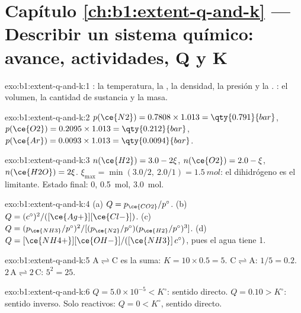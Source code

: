 \section*{Capítulo \ref{ch:b1:extent-q-and-k} --- Describir un sistema químico: avance, actividades, Q y K}

\begin{solution}{exo:b1:extent-q-and-k:1}
: la temperatura, la , la densidad, la
presión y la . : el volumen, la cantidad de
sustancia y la masa.
\end{solution}

\begin{solution}{exo:b1:extent-q-and-k:2}
$p(\ce{N2}) = 0.7808 \times 1.013 = \qty{0.791}{bar}$, $p(\ce{O2}) =
0.2095 \times 1.013 = \qty{0.212}{bar}$, $p(\ce{Ar}) = 0.0093 \times 1.013
= \qty{0.0094}{bar}$.
\end{solution}

\begin{solution}{exo:b1:extent-q-and-k:3}
$n(\ce{H2}) = 3.0 - 2\xi$, $n(\ce{O2}) = 2.0 - \xi$, $n(\ce{H2O}) =
2\xi$. $\xi_{\max} = \min(3.0/2,\ 2.0/1) = \qty{1.5}{mol}$: el dihidrógeno
es el limitante. Estado final:  0,  \qty{0.5}{mol}, 
\qty{3.0}{mol}.
\end{solution}

\begin{solution}{exo:b1:extent-q-and-k:4}
(a) $Q = p_{\ce{CO2}}/p^\circ$. (b) $Q = (c^\circ)^2/([\ce{Ag+}][\ce{Cl-}])$.
(c) $Q = (p_{\ce{NH3}}/p^\circ)^2/[(p_{\ce{N2}}/p^\circ)(p_{\ce{H2}}/p^\circ)^3]$.
(d) $Q = [\ce{NH4+}][\ce{OH-}]/([\ce{NH3}]\,c^\circ)$, pues el agua tiene
 1.
\end{solution}

\begin{solution}{exo:b1:extent-q-and-k:5}
$\mathrm{A \rightleftharpoons C}$ es la suma: $K = 10 \times 0.5 = 5$. $\mathrm{C \rightleftharpoons A}$: $1/5 =
0.2$. $\mathrm{2\,A \rightleftharpoons 2\,C}$: $5^2 = 25$.
\end{solution}

\begin{solution}{exo:b1:extent-q-and-k:6}
$Q = 5.0 \times 10^{-5} < K^\circ$: sentido directo. $Q = 0.10 > K^\circ$:
sentido inverso. Solo reactivos: $Q = 0 < K^\circ$, sentido directo.
\end{solution}

